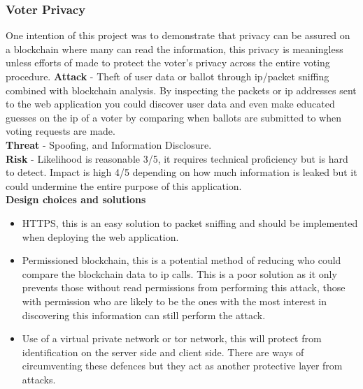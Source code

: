 \documentclass{entcs}
\begin{document}
\subsubsection{Voter Privacy}
One intention of this project was to demonstrate that privacy can be assured on a blockchain where many can read the information, this privacy is meaningless unless efforts of made to protect the voter's privacy across the entire voting procedure. 
\textbf{Attack} - Theft of user data or ballot through ip/packet sniffing \cite{ansari2002packet} combined with blockchain analysis. By inspecting the packets or ip addresses sent to the web application you could discover user data and even make educated guesses on the ip of a voter by comparing when ballots are submitted to when voting requests are made. \\
\textbf{Threat} - Spoofing, and Information Disclosure. \\
\textbf{Risk} - Likelihood is reasonable 3/5, it requires technical proficiency but is hard to detect. Impact is high 4/5 depending on how much information is leaked but it could undermine the entire purpose of this application.\\
\textbf{Design choices and solutions}
\begin{itemize}
    \item HTTPS, this is an easy solution to packet sniffing and should be implemented when deploying the web application.
    \item Permissioned blockchain, this is a potential method of reducing who could compare the blockchain data to ip calls. This is a poor solution as it only prevents those without read permissions from performing this attack, those with permission who are likely to be the ones with the most interest in discovering this information can still perform the attack.
    \item Use of a virtual private network or tor network, this will protect from identification on the server side and client side. There are ways of circumventing these defences but they act as another protective layer from attacks.
\end{itemize}
\end{document}
